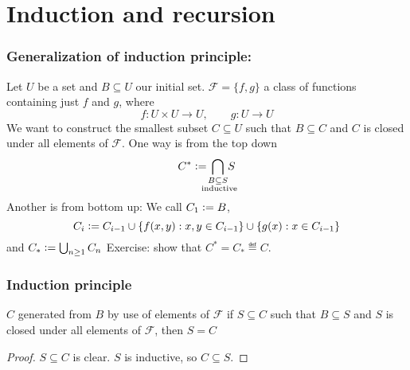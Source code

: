 \section{Induction and recursion}
\subsubsection*{Generalization of induction principle:}
Let $U$ be a set and $B\subseteq U$ our initial set.
$\mathcal{F} = \{f,g\}$ a class of functions containing just $f$ and $g$, where $$f:U\times U\to U, \qquad g: U\to U$$
We want to construct the smallest subset $C\subseteq U$ such that $B\subseteq C$ and $C$ is closed under all elements of $\mathcal{F}$.
\noindent One way is from the top down $$C^* \defeq\, \smashoperator{\bigcap_{\substack{B\subseteq {S}\\\text{ inductive}}}}\,{S}$$
Another is from bottom up: We call $C_1 \vcentcolon= B$, 
$$C_i \vcentcolon= C_{i-1} \cup \{f(x,y) : x,y\in C_{i-1}\}\cup \{g(x) : x\in C_{i-1}\}$$
and $C_* \vcentcolon= \bigcup_{n\geq 1}{C_{n}}$
Exercise: show that $C^* = C_*\eqdef C$.
\subsubsection*{Induction principle}
$C$ generated from $B$ by use of elements of $\mathcal{F}$ if $S\subseteq C$ such that $B\subseteq S$ and $S$ is closed under all
elements of $\mathcal{F}$, then $S = C$
\begin{proof}
    $S\subseteq C$ is clear.
    $S$ is inductive, so $C\subseteq S$.
\end{proof}

